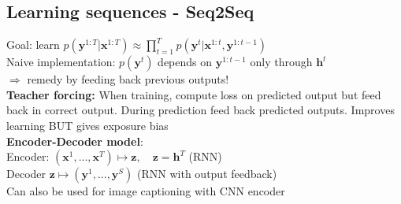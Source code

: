 \subsection*{Learning sequences - Seq2Seq}
Goal: learn $p(\mathbf y^{1:T}|\mathbf x^{1:T})\approx \prod_{t=1}^Tp(\mathbf y^t|\mathbf x^{1:t},\mathbf y^{1:t-1})$\\
Naive implementation: $p(\mathbf y^t)$ depends on $\mathbf y^{1:t-1}$ only through $\mathbf h^t$\\
$\Rightarrow$ remedy by feeding back previous outputs!\\
\textbf{Teacher forcing:} When training, compute loss on predicted output but feed back in correct output. During prediction feed back predicted outputs. Improves learning BUT gives exposure bias\\
\textbf{Encoder-Decoder model}: \\
Encoder: $(\mathbf x^1,...,\mathbf x^T)\mapsto \mathbf z, \quad \mathbf z=\mathbf h^T$ (RNN)\\
Decoder $\mathbf z\mapsto (\mathbf y^1,...,\mathbf y^S)$ (RNN with output feedback)\\
Can also be used for image captioning with CNN encoder